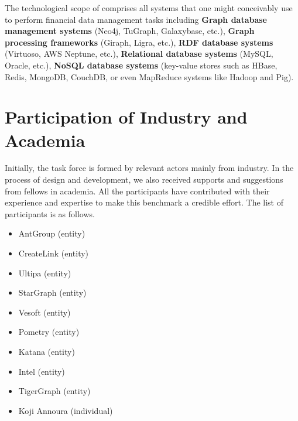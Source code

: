 The technological scope of \ldbcfinbench comprises all systems that one might
conceivably use to perform financial data management tasks including
\textbf{Graph database management systems} (\eg Neo4j, TuGraph, Galaxybase, etc.), \textbf{
      Graph processing frameworks} (\eg Giraph, Ligra, etc.), \textbf{RDF database
      systems} (\eg Virtuoso, AWS Neptune, etc.), \textbf{Relational database systems}
(\eg MySQL, Oracle, etc.), \textbf{NoSQL database systems} (\eg key-value stores
such as HBase, Redis, MongoDB, CouchDB, or even MapReduce systems like Hadoop
and Pig).


\section{Participation of Industry and Academia}

Initially, the \ldbcfinbench task force is formed by relevant actors mainly from
industry. In the process of design and development, we also received supports and
suggestions from fellows in academia. All the participants have contributed with
their experience and expertise to make this benchmark a credible effort. The list
of participants is as follows.

\begin{itemize}
      \item AntGroup (entity)
      \item CreateLink (entity)
      \item Ultipa (entity)
      \item StarGraph (entity)
      \item Vesoft (entity)
      \item Pometry (entity)
      \item Katana (entity)
      \item Intel (entity)
      \item TigerGraph (entity)
      \item Koji Annoura (individual)
\end{itemize}


